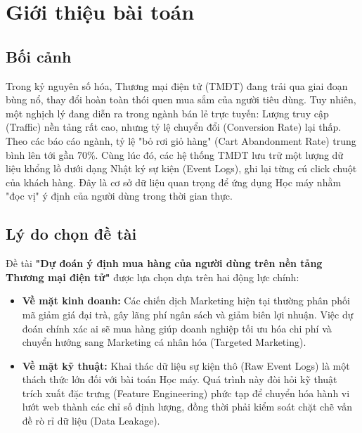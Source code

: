 \documentclass[a4paper,11pt]{article}
\begin{document}
\tableofcontents
\newpage
\listoffigures
\newpage

\listoftables
\newpage
\section{Giới thiệu bài toán}

\subsection{Bối cảnh}
Trong kỷ nguyên số hóa, Thương mại điện tử (TMĐT) đang trải qua giai đoạn bùng nổ, thay đổi hoàn toàn thói quen mua sắm của người tiêu dùng. Tuy nhiên, một nghịch lý đang diễn ra trong ngành bán lẻ trực tuyến: Lượng truy cập (Traffic) nền tảng rất cao, nhưng tỷ lệ chuyển đổi (Conversion Rate) lại thấp. Theo các báo cáo ngành, tỷ lệ "bỏ rơi giỏ hàng" (Cart Abandonment Rate) trung bình lên tới gần 70\%. Cùng lúc đó, các hệ thống TMĐT lưu trữ một lượng dữ liệu khổng lồ dưới dạng Nhật ký sự kiện (Event Logs), ghi lại từng cú click chuột của khách hàng. Đây là cơ sở dữ liệu quan trọng để ứng dụng Học máy nhằm "đọc vị" ý định của người dùng trong thời gian thực.

\subsection{Lý do chọn đề tài}
Đề tài \textbf{"Dự đoán ý định mua hàng của người dùng trên nền tảng Thương mại điện tử"} được lựa chọn dựa trên hai động lực chính:
\begin{itemize}[itemsep=4pt, leftmargin=*]
    \item \textbf{Về mặt kinh doanh:} Các chiến dịch Marketing hiện tại thường phân phối mã giảm giá đại trà, gây lãng phí ngân sách và giảm biên lợi nhuận. Việc dự đoán chính xác ai sẽ mua hàng giúp doanh nghiệp tối ưu hóa chi phí và chuyển hướng sang Marketing cá nhân hóa (Targeted Marketing).
    \item \textbf{Về mặt kỹ thuật:} Khai thác dữ liệu sự kiện thô (Raw Event Logs) là một thách thức lớn đối với bài toán Học máy. Quá trình này đòi hỏi kỹ thuật trích xuất đặc trưng (Feature Engineering) phức tạp để chuyển hóa hành vi lướt web thành các chỉ số định lượng, đồng thời phải kiểm soát chặt chẽ vấn đề rò rỉ dữ liệu (Data Leakage).
\end{itemize}
\end{document}
